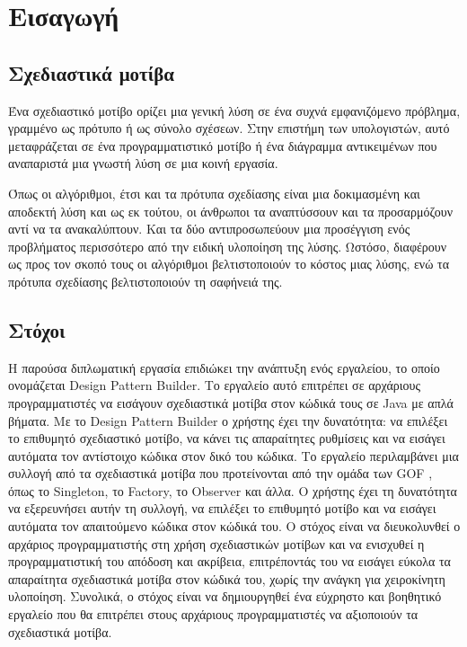 \chapter{Εισαγωγή}
\label{ch:Introduction}
\section{Σχεδιαστικά μοτίβα}
\label{sec:patterns}
Ένα σχεδιαστικό μοτίβο \cite{GoF} ορίζει μια γενική λύση σε ένα συχνά εμφανιζόμενο πρόβλημα, γραμμένο
ως πρότυπο ή ως σύνολο σχέσεων. Στην επιστήμη των υπολογιστών, αυτό μεταφράζεται σε ένα
προγραμματιστικό μοτίβο ή ένα διάγραμμα αντικειμένων που αναπαριστά μια 
γνωστή λύση σε μια κοινή εργασία. \par
Όπως οι αλγόριθμοι, έτσι και τα πρότυπα σχεδίασης είναι μια δοκιμασμένη
και αποδεκτή λύση και ως εκ τούτου, οι άνθρωποι τα αναπτύσσουν και 
τα προσαρμόζουν αντί να τα ανακαλύπτουν.
Και τα δύο αντιπροσωπεύουν μια προσέγγιση ενός προβλήματος περισσότερο από 
την ειδική υλοποίηση της λύσης. Ωστόσο, διαφέρουν ως προς τον σκοπό τους 
οι αλγόριθμοι βελτιστοποιούν το κόστος μιας λύσης, 
ενώ τα πρότυπα σχεδίασης βελτιστοποιούν τη σαφήνειά της.
\section{Στόχοι}
\label{sec:Objectives}
Η παρούσα διπλωματική εργασία επιδιώκει την ανάπτυξη ενός εργαλείου, το οποίο ονομάζεται Design Pattern Builder. 
Το εργαλείο αυτό επιτρέπει σε αρχάριους προγραμματιστές να εισάγουν 
σχεδιαστικά μοτίβα στον κώδικά τους σε Java με απλά βήματα. 
Με το Design Pattern Builder ο χρήστης έχει την δυνατότητα: να επιλέξει το επιθυμητό 
σχεδιαστικό μοτίβο, να κάνει τις απαραίτητες ρυθμίσεις 
και να εισάγει αυτόματα τον αντίστοιχο κώδικα στον δικό του κώδικα. 
Το εργαλείο περιλαμβάνει μια συλλογή από τα σχεδιαστικά μοτίβα που 
προτείνονται από την ομάδα των GOF \cite{GoF}, 
όπως το Singleton, το Factory, το Observer και άλλα. 
Ο χρήστης έχει τη δυνατότητα να εξερευνήσει αυτήν τη συλλογή, να επιλέξει 
το επιθυμητό μοτίβο και να εισάγει αυτόματα τον απαιτούμενο κώδικα στον κώδικά 
του. Ο στόχος είναι να διευκολυνθεί ο αρχάριος προγραμματιστής στη χρήση 
σχεδιαστικών μοτίβων και να ενισχυθεί η προγραμματιστική του απόδοση και ακρίβεια, 
επιτρέποντάς του να εισάγει εύκολα τα απαραίτητα σχεδιαστικά μοτίβα στον κώδικά 
του, χωρίς την ανάγκη για χειροκίνητη υλοποίηση. 
Συνολικά, ο στόχος είναι να δημιουργηθεί ένα εύχρηστο και βοηθητικό 
εργαλείο που θα επιτρέπει στους αρχάριους προγραμματιστές να αξιοποιούν 
τα σχεδιαστικά μοτίβα.
